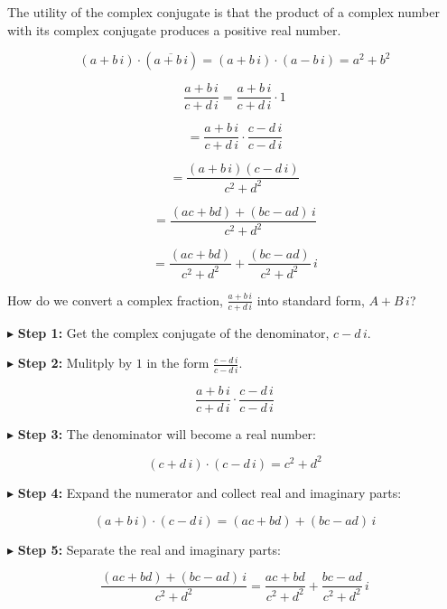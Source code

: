 \documentclass{ximera}
\begin{document}
The utility of the complex conjugate is that the product of a complex number with its complex conjugate produces a positive real number.



\begin{observation}

\[
(a + b \, i) \cdot (\overline{a + b \, i}) = (a + b \, i) \cdot (a - b \, i) = a^2 + b^2
\]

\end{observation}






\[
\frac{a + b \, i}{c + d \, i} = \frac{a + b \, i}{c + d \, i}  \cdot 1 
\]

\[
= \frac{a + b \, i}{c + d \, i} \cdot \frac{c - d \, i}{c - d \, i} 
\]

\[
= \frac{(a + b \, i)(c - d \, i)}{c^2 + d^2} 
\]

\[
= \frac{(ac + bd) + (bc - ad) \, i}{c^2 + d^2} 
\]

\[
= \frac{(ac + bd)}{c^2 + d^2}  + \frac{(bc - ad)}{c^2 + d^2} \, i
\]







\begin{procedure}


How do we convert a complex fraction, $\frac{a + b \, i}{c + d \, i}$ into standard form, $A + B \, i$?



$\blacktriangleright$ \textbf{Step 1:}   Get the complex conjugate of the denominator, $c - d \, i$.


$\blacktriangleright$ \textbf{Step 2:} Mulitply by $1$ in the form $\frac{c - d \, i}{c - d \, i}$.

\[
\frac{a + b \, i}{c + d \, i} \cdot \frac{c - d \, i}{c - d \, i}
\]

$\blacktriangleright$ \textbf{Step 3:}  The denominator will become a real number:  

\[ (c + d \, i) \cdot (c - d \, i) = c^2 + d^2 \]



$\blacktriangleright$ \textbf{Step 4:}  Expand the numerator and collect real and imaginary parts: 

\[ (a + b \, i) \cdot (c - d \, i) = (ac + bd) + (bc - ad) \, i \]


$\blacktriangleright$ \textbf{Step 5:} Separate the real and imaginary parts: 

\[
\frac{(ac + bd) + (bc - ad) \, i}{c^2 + d^2} = \frac{ac + bd}{c^2 + d^2} + \frac{bc - ad}{c^2 + d^2} \, i
\] 



\end{procedure}
\end{document}
